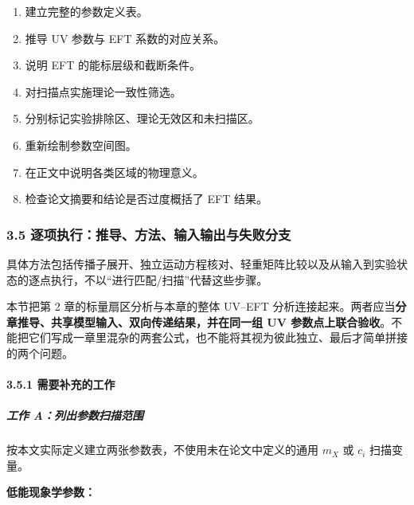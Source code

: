\documentclass[
  chinese,
  UTF8]{ctexart}
\providecommand{\tightlist}{%
  \setlength{\itemsep}{0pt}\setlength{\parskip}{0pt}}
\begin{document}
\begin{enumerate}
\def\labelenumi{\arabic{enumi}.}
\tightlist
\item
  建立完整的参数定义表。
\item
  推导 UV 参数与 EFT 系数的对应关系。
\item
  说明 EFT 的能标层级和截断条件。
\item
  对扫描点实施理论一致性筛选。
\item
  分别标记实验排除区、理论无效区和未扫描区。
\item
  重新绘制参数空间图。
\item
  在正文中说明各类区域的物理意义。
\item
  检查论文摘要和结论是否过度概括了 EFT 结果。
\end{enumerate}

\subsubsection{3.5
逐项执行：推导、方法、输入输出与失败分支}\label{major-2-step-5}

具体方法包括传播子展开、独立运动方程核对、轻重矩阵比较以及从输入到实验状态的逐点执行，不以``进行匹配/扫描''代替这些步骤。

本节把第 2 章的标量扇区分析与本章的整体 UV--EFT
分析连接起来。两者应当\textbf{分章推导、共享模型输入、双向传递结果，并在同一组
UV
参数点上联合验收}。不能把它们写成一章里混杂的两套公式，也不能将其视为彼此独立、最后才简单拼接的两个问题。

\paragraph{3.5.1
需要补充的工作}\label{ux9700ux8981ux8865ux5145ux7684ux5de5ux4f5c}

\subparagraph{工作
A：列出参数扫描范围}\label{ux5de5ux4f5c-aux5217ux51faux53c2ux6570ux626bux63cfux8303ux56f4}

按本文实际定义建立两张参数表，不使用未在论文中定义的通用 \(m_X\) 或
\(c_i\) 扫描变量。

\textbf{低能现象学参数：}
\end{document}
